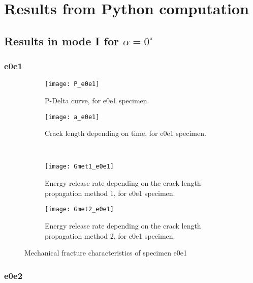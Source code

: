
\chapter{Results from Python computation} %

\label{Appendix1} %


\section{Results in mode I for $\alpha=0 ^\circ$}

\subsection{e0e1}

\begin{figure}[H]
	\centering
	\begin{subfigure}{0.48\linewidth}
		\centering
		\texttt{[image: P\_e0e1]}
		\decoRule
		\caption{P-Delta curve, for e0e1 specimen.}
		\label{fig:P_e0e1}
	\end{subfigure}
	\hfill 
	\begin{subfigure}{0.48\linewidth}
		\centering
		\texttt{[image: a\_e0e1]}
		\decoRule
		\caption{Crack length depending on time, for e0e1 specimen.}
		\label{fig:a_e0e1}
	\end{subfigure}
	\hfill\\
	\begin{subfigure}{0.48\linewidth}
		\centering
		\texttt{[image: Gmet1\_e0e1]}
		\decoRule
		\caption{Energy release rate depending on the crack length propagation method 1, for e0e1 specimen.}
		\label{fig:Gmet1_e0e1}
	\end{subfigure}
	\hfill
	\begin{subfigure}{0.48\linewidth}
		\centering
		\texttt{[image: Gmet2\_e0e1]}
		\decoRule
		\caption{Energy release rate depending on the crack length propagation method 2, for e0e1 specimen.}
		\label{fig:Gmet2_e0e1}
	\end{subfigure}
	\caption{Mechanical fracture characteristics of specimen e0e1}
	\label{e0e1}
\end{figure}

\subsection{e0e2}

